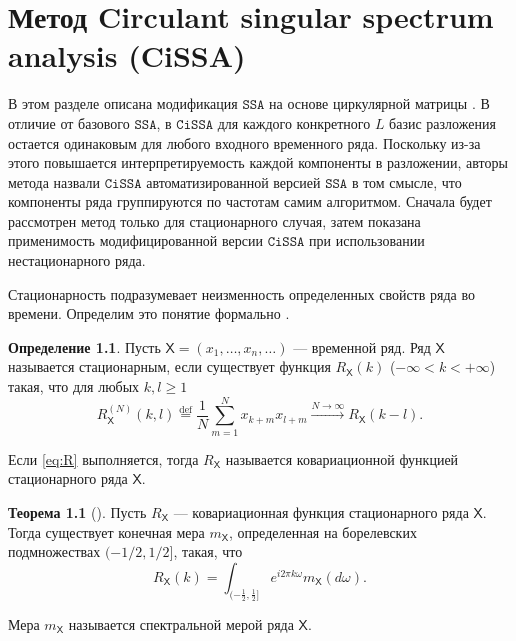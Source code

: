 \documentclass[12pt, specialist, subf
]{disser}
\theoremstyle{definition}
\newcommand{\SSA}{\texttt{SSA}}
\newcommand{\CISSA}{\texttt{CiSSA}}
\newcommand{\TS}{\mathsf{X}}
\newtheorem{definition}{Определение} %
\newtheorem{theorem}{Теорема} %
\begin{document}
\newpage






\chapter{Метод Circulant singular spectrum analysis (CiSSA)}
\label{sec:cissa}


В этом разделе описана модификация $\SSA$ на основе циркулярной матрицы \cite{bogalo2020}. В отличие от базового $\SSA$, в $\CISSA$ для каждого конкретного $L$ базис разложения остается одинаковым для любого входного временного ряда. Поскольку из-за этого повышается интерпретируемость каждой компоненты в разложении, авторы метода назвали $\CISSA$ автоматизированной версией $\SSA$  в том смысле, что компоненты ряда группируются по частотам самим алгоритмом. Сначала будет рассмотрен метод только для стационарного случая, затем показана применимость модифицированной версии $\CISSA$ при использовании нестационарного ряда.

Стационарность подразумевает неизменность определенных свойств ряда во времени. Определим это понятие формально \cite{golyandina2001analysis}.
\begin{definition}
	Пусть $\TS = (x_1, \dots, x_n, \dots)$ — временной ряд. Ряд $\TS$ называется стационарным, если существует функция $R_{\TS}(k)$ ($-\infty < k < +\infty$) такая, что для любых $k, l \geq 1$
	\begin{equation}
		R_{\TS}^{(N)}(k, l) \overset{\mathrm{def}}{=} \frac{1}{N} \sum_{m=1}^{N} x_{k+m} x_{l+m} \xrightarrow{N \to \infty} R_{\TS}(k - l). \label{eq:R}
	\end{equation}

	Если \eqref{eq:R} выполняется, тогда $R_{\TS}$ называется ковариационной функцией стационарного ряда $\TS$.
\end{definition}

\begin{theorem}[{\cite{golyandina2001analysis}}]
	Пусть $R_{\TS}$ — ковариационная функция стационарного ряда $\TS$. Тогда существует конечная мера $m_{\TS}$, определенная на борелевских подмножествах $(-1/2, 1/2]$, такая, что
	\[
		R_{\TS}(k) = \int_{(-\frac{1}{2}, \frac{1}{2}]} e^{i 2 \pi k \omega} m_{\TS}(d\omega).
	\]


	Мера $m_{\TS}$ называется спектральной мерой ряда $\TS$.
\end{theorem}
\end{document}
